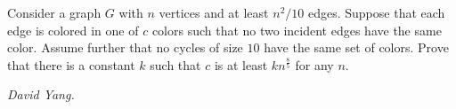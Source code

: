 Consider a graph $G$ with $n$ vertices and at least $n^2/10$ edges. Suppose that each edge is colored in one of $c$ colors such that no two incident edges have the same color. Assume further that no cycles of size $10$ have the same set of colors. Prove that there is a constant $k$ such that $c$ is at least $kn^\frac{8}{5}$ for any $n$.

\textit{David Yang.}